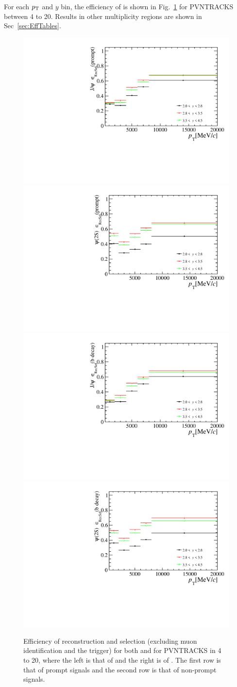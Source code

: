 For each $p_{\mathrm{T}}$ and $y$ bin, the efficiency of \effReco is shown in Fig.~\ref{EffRec} for PVNTRACKS between 4 to 20. Results in other multiplicity regions are shown in Sec~\ref{sec:EffTables}.
\begin{figure}[!tbp]
  \begin{center}
    \includegraphics[width=0.49\linewidth]{pdf/Jpsi/eff_rec_sel/n1_eff_rec_sel_prompt_point.pdf}
    \includegraphics[width=0.49\linewidth]{pdf/Psi2S/eff_rec_sel/n1_eff_rec_sel_prompt_point.pdf}
    \vspace*{-0.5cm}
    \includegraphics[width=0.49\linewidth]{pdf/Jpsi/eff_rec_sel/n1_eff_rec_sel_fromb_point.pdf}
    \includegraphics[width=0.49\linewidth]{pdf/Psi2S/eff_rec_sel/n1_eff_rec_sel_fromb_point.pdf}
  \end{center}
  \caption{
    Efficiency of reconstruction and selection (excluding muon identification and the trigger) for both \jpsi and \psitwos for PVNTRACKS in 4 to 20, where the 
    left is that of \jpsi and the right is of \psitwos. The first row is that of prompt signals and the 
    second row is that of non-prompt signals.}
  \label{EffRec}
\end{figure}
